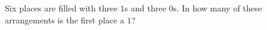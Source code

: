 Six places are filled with three $1$s and three $0$s. In how many of these arrangements is the first place a $1$?
